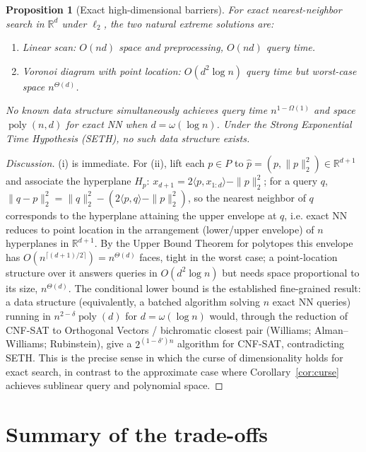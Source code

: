 \documentclass{amsart}
\newtheorem{proposition}{Proposition}
\DeclareMathOperator{\poly}{poly}
\newcommand{\R}{\mathbb{R}}
\begin{document}
\begin{proposition}[Exact high-dimensional barriers]\label{prop:exact}
For exact nearest-neighbor search in $\R^d$ under $\ell_2$, the two natural extreme
solutions are:
\begin{enumerate}
\item[(i)] \emph{Linear scan}: $O(nd)$ space and preprocessing, $O(nd)$ query time.
\item[(ii)] \emph{Voronoi diagram with point location}: $O(d^2\log n)$ query time but
worst-case space $n^{\Theta(d)}$.
\end{enumerate}
No known data structure simultaneously achieves query time $n^{1-\Omega(1)}$ and space
$\poly(n,d)$ for exact NN when $d=\omega(\log n)$.  Under the Strong Exponential Time
Hypothesis (SETH), no such data structure exists.
\end{proposition}
\begin{proof}[Discussion]
(i) is immediate.  For (ii), lift each $p\in P$ to
$\hat p=(p,\|p\|_2^2)\in\R^{d+1}$ and associate the hyperplane
$H_p:\,x_{d+1}=2\langle p,x_{1:d}\rangle-\|p\|_2^2$; for a query $q$,
$\|q-p\|_2^2=\|q\|_2^2-(2\langle p,q\rangle-\|p\|_2^2)$, so the nearest neighbor of $q$
corresponds to the hyperplane attaining the upper envelope at $q$, i.e. exact NN
reduces to point location in the arrangement (lower/upper envelope) of $n$ hyperplanes
in $\R^{d+1}$.  By the Upper Bound Theorem for polytopes this envelope has
$O(n^{\lceil (d+1)/2\rceil})=n^{\Theta(d)}$ faces, tight in the worst case; a
point-location structure over it answers queries in $O(d^2\log n)$ but needs space
proportional to its size, $n^{\Theta(d)}$.  The conditional lower bound is the
established fine-grained result: a data structure (equivalently, a batched algorithm
solving $n$ exact NN queries) running in $n^{2-\delta}\poly(d)$ for $d=\omega(\log n)$
would, through the reduction of CNF-SAT to Orthogonal Vectors / bichromatic closest
pair (Williams; Alman--Williams; Rubinstein), give a $2^{(1-\delta')n}$ algorithm for
CNF-SAT, contradicting SETH.  This is the precise sense in which the curse of
dimensionality holds for exact search, in contrast to the approximate case where
Corollary~\ref{cor:curse} achieves sublinear query and polynomial space.
\end{proof}

\section{Summary of the trade-offs}
\end{document}
